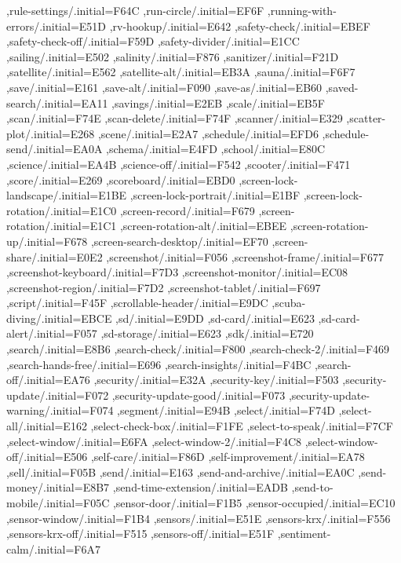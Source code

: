 { ,rule-settings/.initial=F64C
 ,run-circle/.initial=EF6F
 ,running-with-errors/.initial=E51D
 ,rv-hookup/.initial=E642
 ,safety-check/.initial=EBEF
 ,safety-check-off/.initial=F59D
 ,safety-divider/.initial=E1CC
 ,sailing/.initial=E502
 ,salinity/.initial=F876
 ,sanitizer/.initial=F21D
 ,satellite/.initial=E562
 ,satellite-alt/.initial=EB3A
 ,sauna/.initial=F6F7
 ,save/.initial=E161
 ,save-alt/.initial=F090
 ,save-as/.initial=EB60
 ,saved-search/.initial=EA11
 ,savings/.initial=E2EB
 ,scale/.initial=EB5F
 ,scan/.initial=F74E
 ,scan-delete/.initial=F74F
 ,scanner/.initial=E329
 ,scatter-plot/.initial=E268
 ,scene/.initial=E2A7
 ,schedule/.initial=EFD6
 ,schedule-send/.initial=EA0A
 ,schema/.initial=E4FD
 ,school/.initial=E80C
 ,science/.initial=EA4B
 ,science-off/.initial=F542
 ,scooter/.initial=F471
 ,score/.initial=E269
 ,scoreboard/.initial=EBD0
 ,screen-lock-landscape/.initial=E1BE
 ,screen-lock-portrait/.initial=E1BF
 ,screen-lock-rotation/.initial=E1C0
 ,screen-record/.initial=F679
 ,screen-rotation/.initial=E1C1
 ,screen-rotation-alt/.initial=EBEE
 ,screen-rotation-up/.initial=F678
 ,screen-search-desktop/.initial=EF70
 ,screen-share/.initial=E0E2
 ,screenshot/.initial=F056
 ,screenshot-frame/.initial=F677
 ,screenshot-keyboard/.initial=F7D3
 ,screenshot-monitor/.initial=EC08
 ,screenshot-region/.initial=F7D2
 ,screenshot-tablet/.initial=F697
 ,script/.initial=F45F
 ,scrollable-header/.initial=E9DC
 ,scuba-diving/.initial=EBCE
 ,sd/.initial=E9DD
 ,sd-card/.initial=E623
 ,sd-card-alert/.initial=F057
 ,sd-storage/.initial=E623
 ,sdk/.initial=E720
 ,search/.initial=E8B6
 ,search-check/.initial=F800
 ,search-check-2/.initial=F469
 ,search-hands-free/.initial=E696
 ,search-insights/.initial=F4BC
 ,search-off/.initial=EA76
 ,security/.initial=E32A
 ,security-key/.initial=F503
 ,security-update/.initial=F072
 ,security-update-good/.initial=F073
 ,security-update-warning/.initial=F074
 ,segment/.initial=E94B
 ,select/.initial=F74D
 ,select-all/.initial=E162
 ,select-check-box/.initial=F1FE
 ,select-to-speak/.initial=F7CF
 ,select-window/.initial=E6FA
 ,select-window-2/.initial=F4C8
 ,select-window-off/.initial=E506
 ,self-care/.initial=F86D
 ,self-improvement/.initial=EA78
 ,sell/.initial=F05B
 ,send/.initial=E163
 ,send-and-archive/.initial=EA0C
 ,send-money/.initial=E8B7
 ,send-time-extension/.initial=EADB
 ,send-to-mobile/.initial=F05C
 ,sensor-door/.initial=F1B5
 ,sensor-occupied/.initial=EC10
 ,sensor-window/.initial=F1B4
 ,sensors/.initial=E51E
 ,sensors-krx/.initial=F556
 ,sensors-krx-off/.initial=F515
 ,sensors-off/.initial=E51F
 ,sentiment-calm/.initial=F6A7
}
